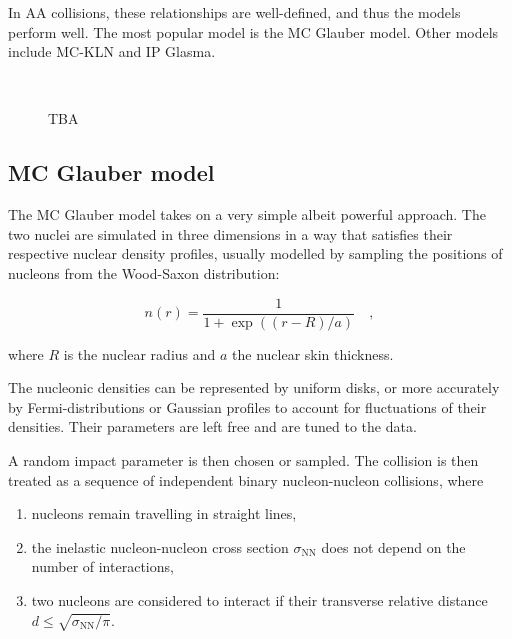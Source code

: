 In AA collisions, these relationships are well-defined, and thus the models perform well. The most popular model is the MC Glauber model. Other models include MC-KLN and IP Glasma.

\begin{figure}[H]
\\
\caption{TBA}
\label{fig:colls:centrality}
\end{figure}

\subsection{MC Glauber model}

The MC Glauber model takes on a very simple albeit powerful approach. The two nuclei are simulated in three dimensions in a way that satisfies their respective nuclear density profiles, usually modelled by sampling the positions of nucleons from the Wood-Saxon distribution:

\begin{minipage}{0.5\linewidth}
    \begin{center}
    \end{center}
\end{minipage}%
\begin{minipage}{0.5\linewidth}
    \begin{equation}
        n(r) = \frac{1}{1+\exp((r-R)/a)} \quad ,
    \end{equation}
\end{minipage}

where $R$ is the nuclear radius and $a$ the nuclear skin thickness.

The nucleonic densities can be represented by uniform disks, or more accurately by Fermi-distributions or Gaussian profiles to account for fluctuations of their densities. Their parameters are left free and are tuned to the data.

A random impact parameter is then chosen or sampled. The collision is then treated as a sequence of independent binary nucleon-nucleon collisions, where
\begin{enumerate}
\item nucleons remain travelling in straight lines,
\item the inelastic nucleon-nucleon cross section $\sigma_\mathrm{NN}$ does not depend on the number of interactions,
\item two nucleons are considered to interact if their transverse relative distance $d \leq \sqrt{\sigma_\mathrm{NN}/\pi}$.
\end{enumerate}

